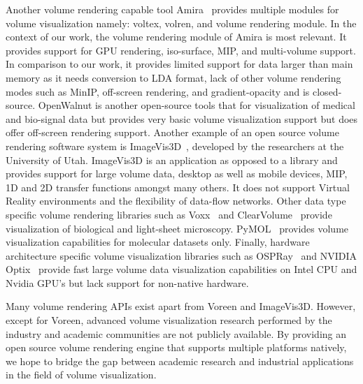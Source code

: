 Another volume rendering capable tool Amira~\citep{stalling2005amira} provides
multiple modules for volume visualization namely: voltex, volren, and volume
rendering module. In the context of our work, the volume rendering module of
Amira is most relevant. It provides support for GPU rendering, iso-surface, MIP,
and multi-volume support. In comparison to our work, it provides limited
support for data larger than main memory as it needs conversion to LDA format,
lack of other volume rendering modes such as MinIP, off-screen rendering,
and gradient-opacity and is closed-source. OpenWalnut is another open-source
tools that for visualization of medical and bio-signal data but provides very
basic volume visualization support but does offer off-screen rendering support.
Another example of an open source volume rendering software system is
ImageVis3D~\citep{cibc_imagevis3D:_2016}, developed by the researchers at the
University of Utah. ImageVis3D is an application as opposed to a library and
provides support for large volume data, desktop as well as mobile devices, MIP,
1D and 2D transfer functions amongst many others.  It does not support Virtual
Reality environments and the flexibility of data-flow networks. Other data
type specific volume rendering libraries such as
Voxx~\citep{clendenon_voxx:_2002} and
ClearVolume~\citep{royer_clearvolume:_2015} provide visualization of
biological and light-sheet microscopy.
PyMOL~\citep{schrodinger_llc_pymol_2015} provides volume visualization
capabilities for molecular datasets only. Finally, hardware architecture
specific volume visualization libraries such as
OSPRay~\citep{wald_ospray_2017} and NVIDIA\textsuperscript{\textregistered}
Optix\textsuperscript{\texttrademark}~\citep{parker_optix:_2010} provide fast
large volume data visualization capabilities on Intel CPU and Nvidia GPU's but
lack support for non-native hardware.

Many volume rendering APIs exist apart from Voreen and ImageVis3D. However,
except for Voreen, advanced volume visualization research performed by the
industry and academic communities are not publicly available. By providing an
open source volume rendering engine that supports multiple platforms natively,
we hope to bridge the gap between academic research and industrial applications
in the field of volume visualization.
